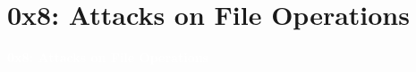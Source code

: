 \documentclass[aspectratio=169]{beamer}
\begin{document}
\section{0x8: Attacks on File Operations}
{
\begin{frame}
\huge{\textcolor{white}{\textbf{0x8: Attacks on File Operations}}}
\end{frame}
}
\end{document}
